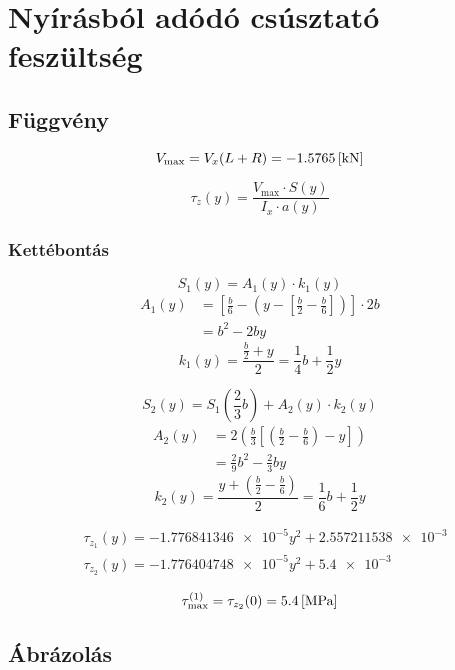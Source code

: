\section{Nyírásból adódó csúsztató feszültség}

\subsection{Függvény}

\begin{equation*}
	V_\text{max} = V_x (L+R) = \SI{-1.5765}{[\kilo\newton]}
\end{equation*}

\begin{equation*}
	\tau_z(y) = \frac{V_\text{max} \cdot S(y)}{I_x \cdot a(y)}
\end{equation*}

\subsubsection{Kettébontás}

\begin{multicols}{2}
	\begin{equation*}
		S_1(y) = A_1(y) \cdot k_1(y)
	\end{equation*}
	\begin{align*}
		A_1(y) &= \left[ 
			\frac{b}{6} 
			- \left(y - \left[\frac{b}{2} - \frac{b}{6} \right] \right)
		\right] \cdot 2b
		\\&= b^2 -2by
	\end{align*}
	\begin{equation*}
		k_1(y) = \frac{\frac{b}{2} + y}{2} = \frac{1}{4}b+\frac{1}{2}y
	\end{equation*}

	\columnbreak
	\begin{equation*}
		S_2(y) = S_1\left(\frac{2}{3}b\right) + A_2(y) \cdot k_2(y)
	\end{equation*}
	\begin{align*}
		A_2(y) &= 2\left(\frac{b}{3} \left[\left(\frac{b}{2} - \frac{b}{6}\right) - y \right] \right)
		     \\&=\frac{2}{9}b^2 - \frac{2}{3}by
	\end{align*}
	\begin{equation*}
		k_2(y) = \frac{y + \left(\frac{b}{2} - \frac{b}{6} \right)}{2}
		= \frac{1}{6}b + \frac{1}{2}y
	\end{equation*}

\end{multicols}

\begin{align*}
	&\tau_{z_1}(y) = \num{-1.776841346e-5}y^2 + \num{2.557211538e-3} \\
	&\tau_{z_2}(y) = \num{-1.776404748e-5}y^2 + \num{5.4e-3}
\end{align*}

\begin{equation*}
	\tau^{(1)}_\text{max} = \tau_{z_2}(0) = \SI{5.4}{[\mega\pascal]}
\end{equation*}

\subsection{Ábrázolás}

